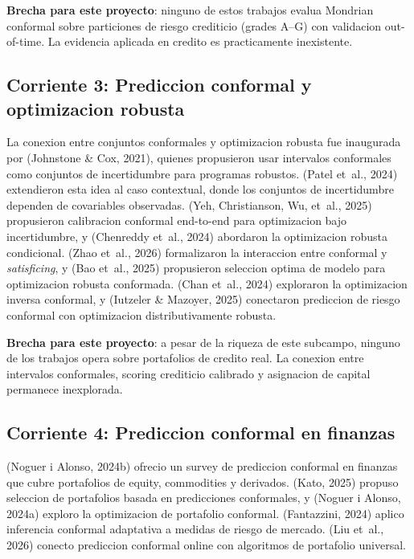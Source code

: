 \documentclass[
  spanish,
  11pt,
  letterpaper,
]{scrbook}
\theoremstyle{plain}
\theoremstyle{remark}
\begin{document}
\textbf{Brecha para este proyecto}: ninguno de estos trabajos evalua
Mondrian conformal sobre particiones de riesgo crediticio (grades A--G)
con validacion out-of-time. La evidencia aplicada en credito es
practicamente inexistente.

\subsection{Corriente 3: Prediccion conformal y optimizacion
robusta}\label{sec-sota-cro}

La conexion entre conjuntos conformales y optimizacion robusta fue
inaugurada por (Johnstone \& Cox, 2021), quienes propusieron usar
intervalos conformales como conjuntos de incertidumbre para programas
robustos. (Patel et~al., 2024) extendieron esta idea al caso contextual,
donde los conjuntos de incertidumbre dependen de covariables observadas.
(Yeh, Christianson, Wu, et~al., 2025) propusieron calibracion conformal
end-to-end para optimizacion bajo incertidumbre, y ({Chenreddy et~al.},
2024) abordaron la optimizacion robusta condicional. (Zhao et~al., 2026)
formalizaron la interaccion entre conformal y \emph{satisficing}, y (Bao
et~al., 2025) propusieron seleccion optima de modelo para optimizacion
robusta conformada. (Chan et~al., 2024) exploraron la optimizacion
inversa conformal, y (Iutzeler \& Mazoyer, 2025) conectaron prediccion
de riesgo conformal con optimizacion distributivamente robusta.

\textbf{Brecha para este proyecto}: a pesar de la riqueza de este
subcampo, ninguno de los trabajos opera sobre portafolios de credito
real. La conexion entre intervalos conformales, scoring crediticio
calibrado y asignacion de capital permanece inexplorada.

\subsection{Corriente 4: Prediccion conformal en
finanzas}\label{sec-sota-finance}

(Noguer i Alonso, 2024b) ofrecio un survey de prediccion conformal en
finanzas que cubre portafolios de equity, commodities y derivados.
(Kato, 2025) propuso seleccion de portafolios basada en predicciones
conformales, y (Noguer i Alonso, 2024a) exploro la optimizacion de
portafolio conformal. (Fantazzini, 2024) aplico inferencia conformal
adaptativa a medidas de riesgo de mercado. (Liu et~al., 2026) conecto
prediccion conformal online con algoritmos de portafolio universal.
\end{document}
